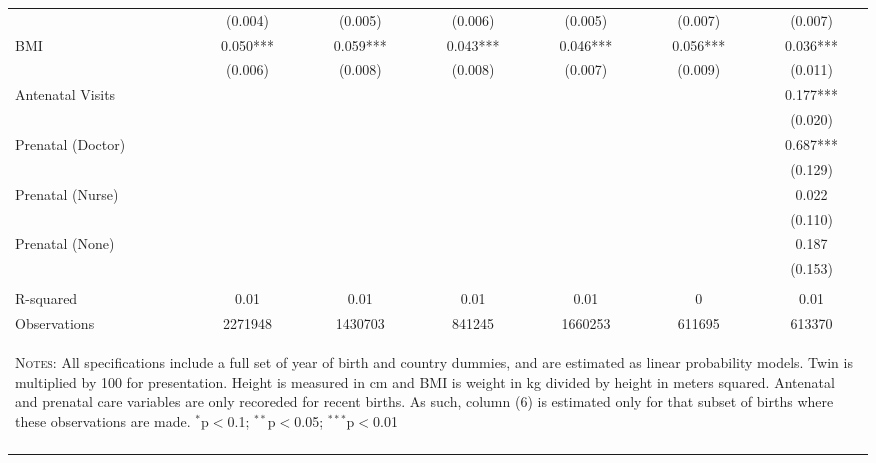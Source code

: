 \begin{landscape}
\begin{table}[htpb!]
\begin{center}
\begin{tabular}{lcccccc}
&(0.004)&(0.005)&(0.006)&(0.005)&(0.007)&(0.007)\\
BMI&0.050***&0.059***&0.043***&0.046***&0.056***&0.036***\\
&(0.006)&(0.008)&(0.008)&(0.007)&(0.009)&(0.011)\\
Antenatal Visits&&&&&&0.177***\\
&&&&&&(0.020)\\
Prenatal (Doctor)&&&&&&0.687***\\
&&&&&&(0.129)\\
Prenatal (Nurse)&&&&&&0.022\\
&&&&&&(0.110)\\
Prenatal (None)&&&&&&0.187\\
&&&&&&(0.153)\\
&&&&&&\\R-squared&0.01&0.01&0.01&0.01&0&0.01\\
Observations &2271948&1430703&841245&1660253&611695&613370\\
\hline\hline\multicolumn{7}{p{14.3cm}}{\begin{footnotesize}\textsc{Notes:} All specifications include a full set of year of birth and  country dummies, and are estimated as linear probability models.  Twin is multiplied by 100 for presentation.  Height is measured in cm  and BMI is weight in kg divided by height in meters squared.  Antenatal  and prenatal care variables are only recoreded for recent births.  As  such, column (6) is estimated only for that subset of births where  these observations are made.
$^{*}$p$<$0.1; $^{**}$p$<$0.05; $^{***}$p$<$0.01
 \end{footnotesize}}\\ \hline \normalsize \end{tabular}\end{center}\end{table}\end{landscape} 
